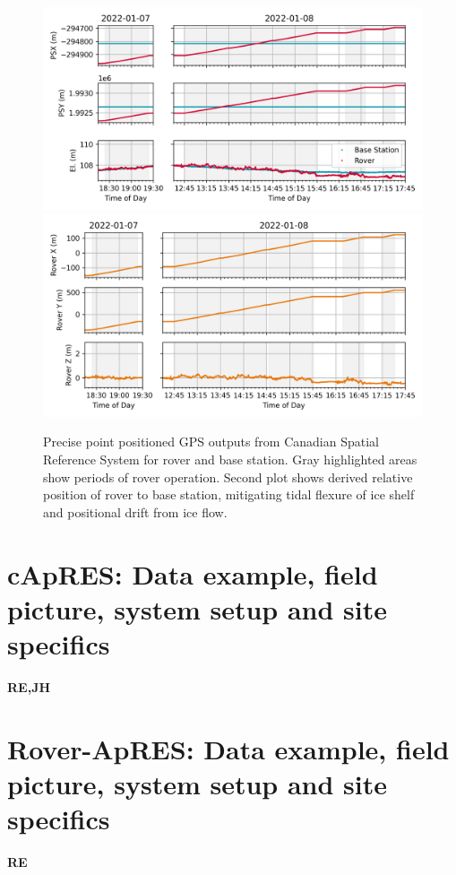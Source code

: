 \documentclass[a4paper,12pt]{article}
\newcommand{\ProtocolTable}[6]
{
\begin{table}[]
\begin{tabular}{|p{1.8cm} p{3.8cm} p{1.8cm} p{2.0cm}|}
\hline
 \rowcolor{beaublue}\textbf{Name}:&\multicolumn{3}{l}{#1} \\
 \rowcolor{beaublue}\textbf{Folder:}&\multicolumn{3}{l}{#2} \\
 \rowcolor{beaublue}\textbf{Instrument:}&#3&\textbf{Date:}&#4 \\
  \rowcolor{beaublue}\textbf{Operator:}&#5&\textbf{Location:}&#6\\
\hline
\end{tabular}
\end{table}
}
\begin{document}
\begin{figure}[h!]
  \centering 
  \includegraphics{../../Doc/ApRES/Rover/HF/StartStop/StartStopRTKPositions.png}
  \includegraphics{../../Doc/ApRES/Rover/HF/StartStop/StartStopRoverPositions.png}
  \caption{Precise point positioned GPS outputs from Canadian Spatial Reference
  System for rover and base station.  Gray highlighted areas show periods of rover
  operation.  Second plot shows derived relative position of rover to base 
  station, mitigating tidal flexure of ice shelf and positional drift from ice 
  flow.}
  \label{FigureHFApRESGNSS}
\end{figure}
\clearpage

\pagebreak
\section{cApRES: Data example, field picture, system setup and site specifics}
\label{SeccApRES}
\textbf{RE,JH}


\pagebreak
\section{Rover-ApRES: Data example, field picture, system setup and site specifics}
\label{SecRoverApRES}
\textbf{RE}


%
\end{document}
